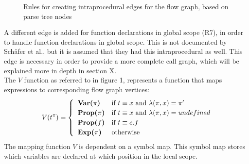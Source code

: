 \documentclass[journal,10pt]{IEEEtran}
\begin{document}
\begin{figure}[H]
\hspace*{-.4cm}
\caption{Rules for creating intraprocedural edges for the flow graph, based on parse tree nodes}
\end{figure}

A different edge is added for function declarations in global scope (R7), in order to handle function declarations in global scope. This is not documented by Sch\"{a}fer et al., but it is assumed that they had this intraprocedural as well. This edge is necessary in order to provide a more complete call graph, which will be explained more in depth in section X. \\ %

The $V$ function as referred to in figure 1, represents a function that maps expressions to corresponding flow graph vertices:
\begin{equation*}
  V(t^\pi) = \begin{cases}
    \hspace*{0.2cm} \textbf{Var($\pi$)} & \text{if~} t \equiv x \text{~and~} \lambda(\pi, x) = \pi' \\
    \hspace*{0.2cm} \textbf{Prop($\pi$)} & \text{if~} t \equiv x \text{~and~} \lambda(\pi, x) = undefined\\
    \hspace*{0.2cm} \textbf{Prop($f$)} & \text{if~} t \equiv e.f \\
    \hspace*{0.2cm} \textbf{Exp($\pi$)} &\text{otherwise}
  \end{cases}
\end{equation*}
The mapping function $V$ is dependent on a symbol map. This symbol map stores which variables are declared at which position in the local scope.
\end{document}
